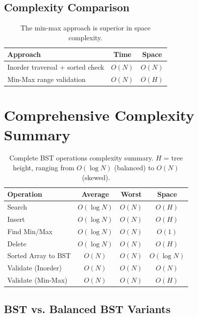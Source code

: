\documentclass[10pt,journal,compsoc,onecolumn]{IEEEtran}
\begin{document}
\subsection{Complexity Comparison}

\begin{table}[htbp]
\centering
\begin{tabular}{|l|c|c|}
\hline
\textbf{Approach} & \textbf{Time} & \textbf{Space} \\
\hline
Inorder traversal + sorted check & $O(N)$ & $O(N)$ \\
Min-Max range validation & $O(N)$ & $O(H)$ \\
\hline
\end{tabular}
\caption{The min-max approach is superior in space complexity.}
\end{table}

\section{Comprehensive Complexity Summary}
\label{sec:summary}

\begin{table}[htbp]
\centering
\begin{tabular}{|l|c|c|c|}
\hline
\textbf{Operation} & \textbf{Average} & \textbf{Worst} & \textbf{Space} \\
\hline
Search & $O(\log N)$ & $O(N)$ & $O(H)$ \\
Insert & $O(\log N)$ & $O(N)$ & $O(H)$ \\
Find Min/Max & $O(\log N)$ & $O(N)$ & $O(1)$ \\
Delete & $O(\log N)$ & $O(N)$ & $O(H)$ \\
Sorted Array to BST & $O(N)$ & $O(N)$ & $O(\log N)$ \\
Validate (Inorder) & $O(N)$ & $O(N)$ & $O(N)$ \\
Validate (Min-Max) & $O(N)$ & $O(N)$ & $O(H)$ \\
\hline
\end{tabular}
\caption{Complete BST operations complexity summary. $H$ = tree height, ranging from $O(\log N)$ (balanced) to $O(N)$ (skewed).}
\end{table}

\subsection{BST vs. Balanced BST Variants}
\end{document}
